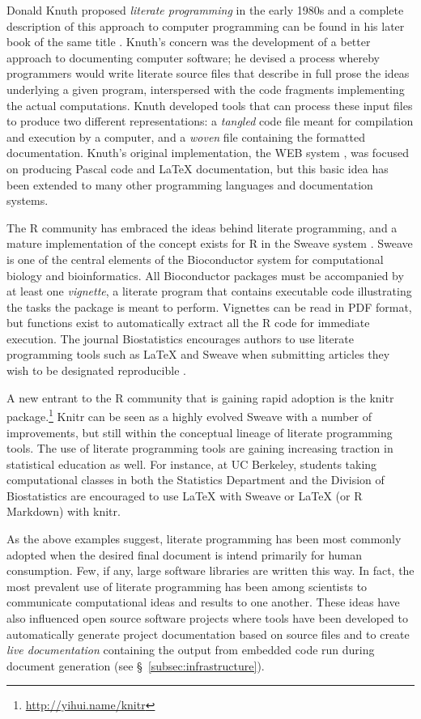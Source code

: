 \documentclass[11pt,oneside,english]{article}
\begin{document}
Donald Knuth proposed \emph{literate programming} in the early 1980s and a
complete description of this approach to computer programming can be found in
his later book of the same title \cite{Knuth92}.  Knuth's concern was the
development of a better approach to documenting computer software; he devised a
process whereby programmers would write literate source files that describe in
full prose the ideas underlying a given program, interspersed with the code
fragments implementing the actual computations.  Knuth developed tools that can
process these input files to produce two different representations: a
\emph{tangled} code file meant for compilation and execution by a computer, and
a \emph{woven} file containing the formatted documentation.  Knuth's original
implementation, the WEB system \cite{Knuth:1983:WSS}, was focused on producing
Pascal code and \LaTeX{} documentation, but this basic idea has been extended
to many other programming languages and documentation systems.  

The R community has embraced the ideas behind literate programming,
and a mature implementation of the concept exists for R in the Sweave system
\cite{lmucs-papers:Leisch:2002}.  Sweave is one of the central elements of the
Bioconductor system \cite{Gentleman2004, Dudoit2003} for computational biology
and bioinformatics.  All Bioconductor packages must be accompanied by at least
one \emph{vignette}, a literate program that contains executable
code illustrating the tasks the package is meant to perform.  Vignettes can be
read in PDF format, but functions exist to automatically extract all the R code
for immediate execution.  The journal Biostatistics encourages authors to use
literate programming tools such as \LaTeX{} and Sweave when submitting articles
they wish to be designated reproducible \cite{Peng01072009}.

A new entrant to the R community that is gaining rapid adoption is the knitr
package.\footnote{\url{http://yihui.name/knitr}}  Knitr can be seen as a highly
evolved Sweave with a number of improvements, but still within the conceptual
lineage of literate programming tools.  The use of literate programming tools
are gaining increasing traction in statistical education as well.  For
instance, at UC Berkeley, students taking computational classes in both the
Statistics Department and the Division of Biostatistics are
encouraged to use \LaTeX{} with Sweave or \LaTeX{} (or R Markdown) with knitr.

As the above examples suggest, literate programming has been most commonly
adopted when the desired final document is intend primarily for human
consumption.  Few, if any, large software libraries are written this way.  In
fact, the most prevalent use of literate programming has been among scientists
to communicate computational ideas and results to one another.  These ideas
have also influenced open source software projects where tools have been
developed to automatically generate project documentation based on source files
and to create \emph{live documentation} containing the output from embedded
code run during document generation (see §~\ref{subsec:infrastructure}).
\end{document}
